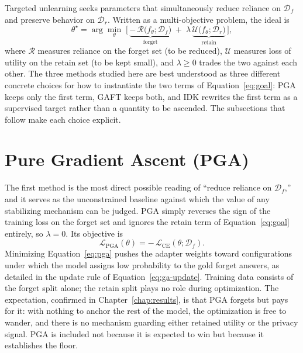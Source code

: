 \documentclass[a4paper,12pt]{report}
\begin{document}
Targeted unlearning seeks parameters that simultaneously reduce reliance on $\mathcal{D}_f$ and preserve behavior on $\mathcal{D}_r$. Written as a multi-objective problem, the ideal is
\begin{equation}
	\theta^\star = \arg\min_{\theta}\; \Big[\, \underbrace{-\,\mathcal{R}\big(f_\theta; \mathcal{D}_f\big)}_{\text{forget}} \;+\; \lambda\, \underbrace{\mathcal{U}\big(f_\theta; \mathcal{D}_r\big)}_{\text{retain}} \,\Big],
	\label{eq:goal}
\end{equation}
where $\mathcal{R}$ measures reliance on the forget set (to be reduced), $\mathcal{U}$ measures loss of utility on the retain set (to be kept small), and $\lambda \ge 0$ trades the two against each other. The three methods studied here are best understood as three different concrete choices for how to instantiate the two terms of Equation~\eqref{eq:goal}: PGA keeps only the first term, GAFT keeps both, and IDK rewrites the first term as a supervised target rather than a quantity to be ascended. The subsections that follow make each choice explicit.

\section{Pure Gradient Ascent (PGA)}
The first method is the most direct possible reading of ``reduce reliance on $\mathcal{D}_f$,'' and it serves as the unconstrained baseline against which the value of any stabilizing mechanism can be judged. PGA simply reverses the sign of the training loss on the forget set and ignores the retain term of Equation~\eqref{eq:goal} entirely, so $\lambda = 0$. Its objective is
\begin{equation}
	\mathcal{L}_{\mathrm{PGA}}(\theta) = -\,\mathcal{L}_{\mathrm{CE}}(\theta; \mathcal{D}_f).
	\label{eq:pga}
\end{equation}
Minimizing Equation~\eqref{eq:pga} pushes the adapter weights toward configurations under which the model assigns low probability to the gold forget answers, as detailed in the update rule of Equation~\eqref{eq:ga-update}. Training data consists of the forget split alone; the retain split plays no role during optimization. The expectation, confirmed in Chapter~\ref{chap:results}, is that PGA forgets but pays for it: with nothing to anchor the rest of the model, the optimization is free to wander, and there is no mechanism guarding either retained utility or the privacy signal. PGA is included not because it is expected to win but because it establishes the floor.
\end{document}
